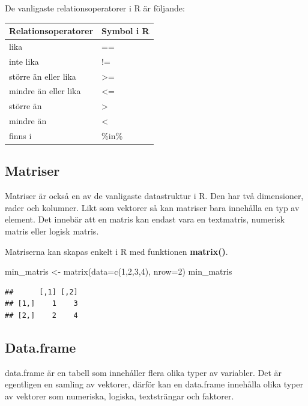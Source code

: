 \documentclass[
]{book}
\newenvironment{Shaded}{\begin{snugshade}}{\end{snugshade}}
\newcommand{\AttributeTok}[1]{\textcolor[rgb]{0.77,0.63,0.00}{#1}}
\newcommand{\DecValTok}[1]{\textcolor[rgb]{0.00,0.00,0.81}{#1}}
\newcommand{\FunctionTok}[1]{\textcolor[rgb]{0.00,0.00,0.00}{#1}}
\newcommand{\NormalTok}[1]{#1}
\newcommand{\OtherTok}[1]{\textcolor[rgb]{0.56,0.35,0.01}{#1}}
\begin{document}
De vanligaste relationsoperatorer i R är följande:

\begin{longtable}[]{@{}ll@{}}
\toprule
Relationsoperatorer & Symbol i R\tabularnewline
\midrule
\endhead
lika & ==\tabularnewline
inte lika & !=\tabularnewline
större än eller lika & \textgreater=\tabularnewline
mindre än eller lika & \textless=\tabularnewline
större än & \textgreater{}\tabularnewline
mindre än & \textless{}\tabularnewline
finns i & \%in\%\tabularnewline
\bottomrule
\end{longtable}

\hypertarget{matriser}{%
\subsection{Matriser}\label{matriser}}

Matriser är också en av de vanligaste datastruktur i R. Den har två dimensioner, rader och kolumner. Likt som vektorer så kan matriser bara innehålla en typ av element. Det innebär att en matris kan endast vara en textmatris, numerisk matris eller logisk matris.

Matriserna kan skapas enkelt i R med funktionen \textbf{matrix()}.

\begin{Shaded}
\begin{Highlighting}[]
\NormalTok{min\_matris }\OtherTok{\textless{}{-}} \FunctionTok{matrix}\NormalTok{(}\AttributeTok{data=}\FunctionTok{c}\NormalTok{(}\DecValTok{1}\NormalTok{,}\DecValTok{2}\NormalTok{,}\DecValTok{3}\NormalTok{,}\DecValTok{4}\NormalTok{), }\AttributeTok{nrow=}\DecValTok{2}\NormalTok{)}
\NormalTok{min\_matris}
\end{Highlighting}
\end{Shaded}

\begin{verbatim}
##      [,1] [,2]
## [1,]    1    3
## [2,]    2    4
\end{verbatim}

\hypertarget{data.frame}{%
\subsection{Data.frame}\label{data.frame}}

data.frame är en tabell som innehåller flera olika typer av variabler. Det är egentligen en samling av vektorer, därför kan en data.frame innehålla olika typer av vektorer som numeriska, logiska, textsträngar och faktorer.
\end{document}
